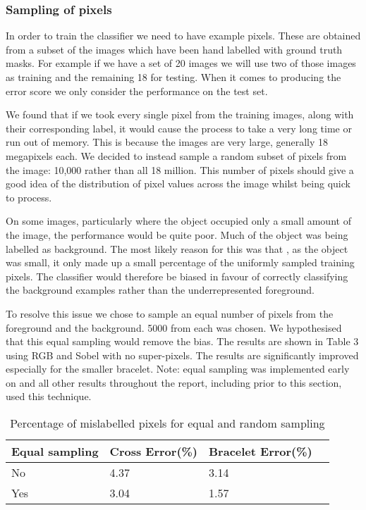 \documentclass[12pt]{IIBproject}
\begin{document}
\subsubsection{Sampling of pixels}
In order to train the classifier we need to have example pixels. These are obtained from a subset of the images which have been hand labelled with ground truth masks. For example if we have a set of 20 images we will use two of those images as training and the remaining 18 for testing. When it comes to producing the error score we only consider the performance on the test set. 

We found that if we took every single pixel from the training images, along with their corresponding label, it would cause the process to take a very long time or run out of memory. This is because the images are very large, generally 18 megapixels each. We decided to instead sample a random subset of pixels from the image: 10,000 rather than all 18 million. This number of pixels should give a good idea of the distribution of pixel values across the image whilst being quick to process. 

On some images, particularly where the object occupied only a small amount of the image, the performance would be quite poor. Much of the object was being labelled as background. The most likely reason for this was that , as the object was small, it only made up a small percentage of the uniformly sampled training pixels. The classifier would therefore be biased in favour of correctly classifying the background examples rather than the underrepresented foreground.

 To resolve this issue we chose to sample an equal number of pixels from the foreground and the background. 5000 from each was chosen. We hypothesised that this equal sampling would remove the bias. The results are shown in Table 3 using RGB and Sobel with no super-pixels. The results are significantly improved especially for the smaller bracelet. Note: equal sampling  was implemented early on and all other results throughout the report, including prior to this section, used this technique.
 \begin{table}[H]
 \begin{center}
    \begin{tabular}{ | l | l | l | p{5cm} |}
    \hline
    Equal sampling & Cross Error(\%) & Bracelet Error(\%) \\ \hline
    No & 4.37 & 3.14 \\ \hline
    Yes & 3.04 & 1.57 \\
    \hline
    
    \end{tabular}
    \caption{Percentage of mislabelled pixels for equal and random sampling}\label{table:somename}
\end{center}
\end{table}
 
\end{document}
